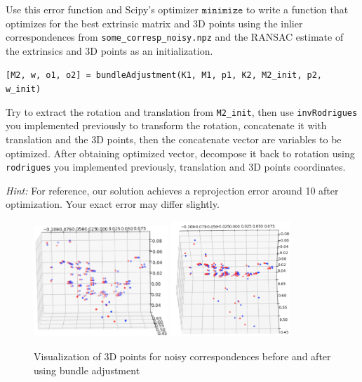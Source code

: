 Use this error function and Scipy's optimizer $\texttt{minimize}$ to write a function that optimizes for the best extrinsic matrix and 3D points using the inlier correspondences from \texttt{some\_corresp\_noisy.npz} and the RANSAC estimate of the extrinsics and 3D points as an initialization.

\begin{center}
\texttt{[M2, w, o1, o2] = bundleAdjustment(K1, M1, p1, K2, M2\_init, p2, w\_init)}
\end{center}

Try to extract the rotation and translation from \texttt{M2\_init}, then use \texttt{invRodrigues} you implemented previously to transform the rotation, concatenate it with translation and the 3D points, then the concatenate vector are variables to be optimized. After obtaining optimized vector, decompose it back to rotation using \texttt{rodrigues} you implemented previously, translation and 3D points coordinates.


\textit{Hint:} For reference, our solution achieves a reprojection error around 10 after optimization. Your exact error may differ slightly. 

\begin{your_solution}[title=Q5.3,height=5.5cm,width=\linewidth]
\end{your_solution}

\begin{figure}[h!]
    \centering
    \includegraphics[width=0.45\textwidth]{images/q5_3.png}
    \includegraphics[width=0.4\textwidth]{images/q5_3b.png}
\caption{Visualization of 3D points for noisy correspondences before and after using bundle
adjustment}
    \label{fig:q5}
\end{figure}